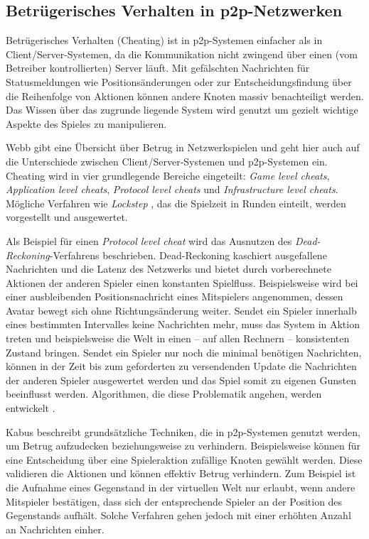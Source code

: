 \subsection{Betrügerisches Verhalten in p2p-Netzwerken}
\label{chap:grundlagen:cheating}
Betrügerisches Verhalten (Cheating) ist in p2p-Systemen einfacher als in Client/Server-Systemen, da die Kommunikation nicht zwingend über einen (vom Betreiber kontrollierten) Server läuft. Mit gefälschten Nachrichten für Statusmeldungen wie Positionsänderungen oder zur Entscheidungsfindung über die Reihenfolge von Aktionen können andere Knoten massiv benachteiligt werden. Das Wissen über das zugrunde liegende System wird genutzt um gezielt wichtige Aspekte des Spieles zu manipulieren.

Webb \cite{Webb2007Cheating} gibt eine Übersicht über Betrug in Netzwerkspielen und geht hier auch auf die Unterschiede zwischen Client/Server-Systemen und p2p-Systemen ein. Cheating wird in vier grundlegende Bereiche eingeteilt: \emph{Game level cheats}, \emph{Application level cheats}, \emph{Protocol level cheats} und \emph{Infrastructure level cheats}. Mögliche Verfahren wie \emph{Lockstep} \cite{Baughman2007}, das die Spielzeit in Runden einteilt, werden vorgestellt und ausgewertet.

Als Beispiel für einen \emph{Protocol level cheat} wird das Ausnutzen des \emph{Dead-Reckoning}-Verfahrens \cite{Pantel2002} beschrieben. Dead-Reckoning kaschiert ausgefallene Nachrichten und die Latenz des Netzwerks und bietet durch vorberechnete Aktionen der anderen Spieler einen konstanten Spielfluss. Beispielsweise wird bei einer ausbleibenden Positionsnachricht eines Mitspielers angenommen, dessen Avatar bewegt sich ohne Richtungsänderung weiter. Sendet ein Spieler innerhalb eines bestimmten Intervalles keine Nachrichten mehr, muss das System in Aktion treten und beispielsweise die Welt in einen -- auf allen Rechnern -- konsistenten Zustand bringen. Sendet ein Spieler nur noch die minimal benötigen Nachrichten, können in der Zeit bis zum geforderten zu versendenden Update die Nachrichten der anderen Spieler ausgewertet werden und das Spiel somit zu eigenen Gunsten beeinflusst werden. Algorithmen, die diese Problematik angehen, werden entwickelt \cite{Aggarwal2005}.

Kabus \cite{Kabus2007Design, Kabus2009} beschreibt grundsätzliche Techniken, die in p2p-Systemen genutzt werden, um Betrug aufzudecken beziehungsweise zu verhindern. Beispielsweise können für eine Entscheidung über eine Spieleraktion zufällige Knoten gewählt werden. Diese validieren die Aktionen und können effektiv Betrug verhindern. Zum Beispiel ist die Aufnahme eines Gegenstand in der virtuellen Welt nur erlaubt, wenn andere Mitspieler bestätigen, dass sich der entsprechende Spieler an der Position des Gegenstands aufhält. Solche Verfahren gehen jedoch mit einer erhöhten Anzahl an Nachrichten einher.

